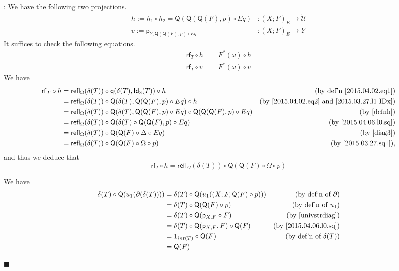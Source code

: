 \documentclass[12pt]{article}
\numberwithin{equation}{section}
\newenvironment{eq}{\begin{equation}}{\end{equation}}
\newenvironment{myproof}{{\bf Proof}:}{$\blacksquare$ \vskip 5mm }
\newcommand{\by}[1]{\text{(by #1)}}
\newcommand{\sr}{\rightarrow}
\newcommand{\wt}{\widetilde}
\newcommand{\id}{1}            %
\newcommand{\p}{\mathsf{p}}
\newcommand{\q}{\mathsf{q}}
\newcommand{\Idx}{\mathsf{Id_3}} %
\newcommand{\refl}{\mathsf{refl}}
\newcommand{\U}{\mathcal{U}}
\newcommand{\rf}{\mathsf{rf}}
\newcommand{\Q}{\mathsf{Q}}
\begin{document}
\begin{myproof}
We have the following two projections.
%
\begin{align}
  h := h_1\circ h_2=\Q(\Q(\Q(F),p)\circ Eq)&:(X;F)_{E}\sr \wt{\U} \label{defnh} \\
  v := \p_{Y,\Q(\Q(F),p)\circ Eq}&:(X;F)_{E} \sr Y                \label{defnv}
\end{align}
%
It suffices to check the following equations.
%
\begin{align*}
  \rf_T\circ h &=F^*(\omega)\circ h \\
  \rf_T\circ v &=F^*(\omega)\circ v
\end{align*}
%
We have
%
\begin{align*}
  \rf_T \circ h
  & = \refl_\Omega(\delta(T))\circ \q(\delta(T),\Idx(T))         \circ h & \by{def'n \ref{2015.04.02.eq1}} \\
  & = \refl_\Omega(\delta(T))\circ \Q(\delta(T),\Q(\Q(F),p)      \circ Eq) \circ h & \by{\ref{2015.04.02.eq2} and \ref{2015.03.27.l1-IDx}} \\
  & = \refl_\Omega(\delta(T))\circ \Q(\delta(T),\Q(\Q(F),p)      \circ Eq) \circ \Q(\Q(\Q(F),p)\circ Eq) & \by{\ref{defnh}} \\
  & = \refl_\Omega(\delta(T))\circ \Q(\delta(T)\circ \Q(\Q(F),p) \circ Eq) & \by{\ref{2015.04.06.l0.sq}}\\
  & = \refl_\Omega(\delta(T))\circ \Q(\Q(F)\circ \Delta          \circ Eq) & \by{\ref{diag3}}\\
  & = \refl_\Omega(\delta(T))\circ \Q(\Q(F)\circ \Omega          \circ p) & \by{\ref{2015.03.27.sq1}},
\end{align*}
and thus we deduce that
\begin{eq}
  \label{eqnrfth}
  \rf_T \circ h = \refl_\Omega(\delta(T))\circ \Q(\Q(F)\circ \Omega \circ p)
\end{eq}

%

We have
%
\begin{align*}
        \delta(T) \circ \Q(u_1(\partial(\delta(T)))) 
    & = \delta(T) \circ \Q(u_1((X;F,\Q(F) \circ p))) & \by{def'n of $\partial$} \\
    & = \delta(T) \circ \Q(\Q(F) \circ p)            & \by{def'n of $u_1$} \\
    & = \delta(T) \circ \Q(\p_{X,F} \circ F)         & \by{\ref{univstrdiag}} \\
    & = \delta(T) \circ \Q(\p_{X,F},F) \circ \Q(F)   & \by{\ref{2015.04.06.l0.sq}} \\
    & = \id_{int(T)} \circ \Q(F)                     & \by{def'n of $\delta(T)$} \\
    & = \Q(F)                                        &
\end{align*}
%


\end{myproof}
\end{document}
